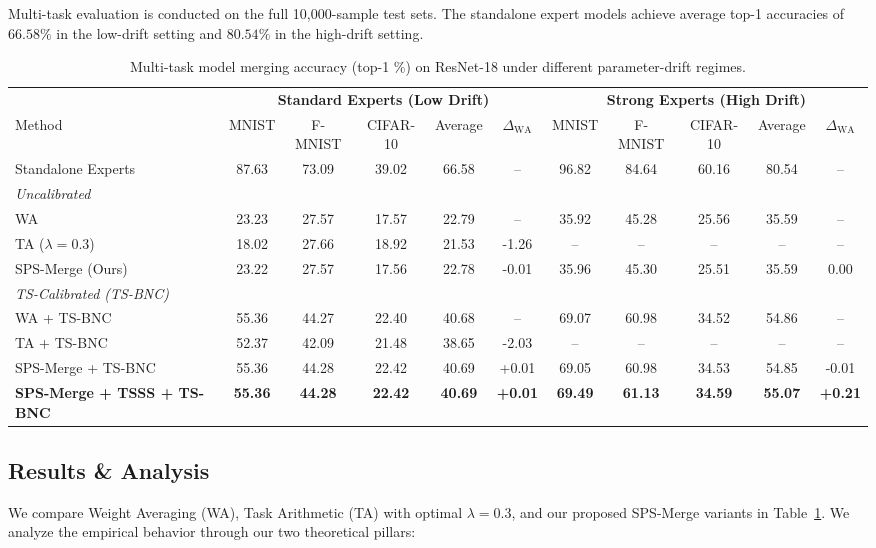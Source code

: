 \documentclass{article}
\theoremstyle{plain}
\theoremstyle{definition}
\theoremstyle{remark}
\begin{document}
Multi-task evaluation is conducted on the full 10,000-sample test sets. The standalone expert models achieve average top-1 accuracies of $66.58\%$ in the low-drift setting and $80.54\%$ in the high-drift setting.

\begin{table}[t]
\centering
\caption{Multi-task model merging accuracy (top-1 \%) on ResNet-18 under different parameter-drift regimes.}
\label{tab:results-unified}
\vskip 0.1in
\footnotesize
\setlength{\tabcolsep}{1.2pt}
\begin{tabular}{lcccccccccc}
\toprule
 & \multicolumn{5}{c}{\textbf{Standard Experts (Low Drift)}} & \multicolumn{5}{c}{\textbf{Strong Experts (High Drift)}} \\
\cmidrule(r){2-6} \cmidrule(l){7-11}
Method & MNIST & F-MNIST & CIFAR-10 & Average & $\Delta_{\text{WA}}$ & MNIST & F-MNIST & CIFAR-10 & Average & $\Delta_{\text{WA}}$ \\
\midrule
Standalone Experts & 87.63 & 73.09 & 39.02 & 66.58 & -- & 96.82 & 84.64 & 60.16 & 80.54 & -- \\
\midrule
\textit{Uncalibrated} \\
WA & 23.23 & 27.57 & 17.57 & 22.79 & -- & 35.92 & 45.28 & 25.56 & 35.59 & -- \\
TA ($\lambda = 0.3$) & 18.02 & 27.66 & 18.92 & 21.53 & -1.26 & -- & -- & -- & -- & -- \\
SPS-Merge (Ours) & 23.22 & 27.57 & 17.56 & 22.78 & -0.01 & 35.96 & 45.30 & 25.51 & 35.59 & 0.00 \\
\midrule
\textit{TS-Calibrated (TS-BNC)} \\
WA + TS-BNC & 55.36 & 44.27 & 22.40 & 40.68 & -- & 69.07 & 60.98 & 34.52 & 54.86 & -- \\
TA + TS-BNC & 52.37 & 42.09 & 21.48 & 38.65 & -2.03 & -- & -- & -- & -- & -- \\
SPS-Merge + TS-BNC & 55.36 & 44.28 & 22.42 & 40.69 & +0.01 & 69.05 & 60.98 & 34.53 & 54.85 & -0.01 \\
\textbf{SPS-Merge + TSSS + TS-BNC} & \textbf{55.36} & \textbf{44.28} & \textbf{22.42} & \textbf{40.69} & \textbf{+0.01} & \textbf{69.49} & \textbf{61.13} & \textbf{34.59} & \textbf{55.07} & \textbf{+0.21} \\
\bottomrule
\end{tabular}
\vspace{-3mm}
\end{table}

\subsection{Results \& Analysis}
We compare Weight Averaging (WA), Task Arithmetic (TA) with optimal $\lambda = 0.3$, and our proposed SPS-Merge variants in Table~\ref{tab:results-unified}. We analyze the empirical behavior through our two theoretical pillars:
\end{document}
